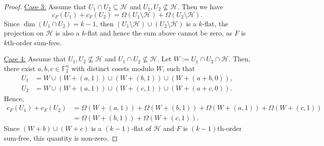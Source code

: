 \documentclass[10pt,a4paper]{amsart}
\newcommand{\F}{\mathbb F}
\newcommand{\HH}{\mathcal{H}}
\begin{document}
\begin{proof}
     \noindent \underline{Case 3:} Assume that $U_1\cap U_2\subseteq \HH$ and $U_1,U_2\not\subseteq \HH$. Then we have
     $$
     c_F(U_1) +c_F(U_2) = \Omega(U_1\setminus \HH) + \Omega(U_2 \setminus \HH).
     $$
     Since $\dim(U_1 \cap U_2) = k-1$, then $(U_1 \setminus \HH) \cup (U_2\setminus \HH)$ is a $k$-flat, the projection on $\HH$ is also a $k$-flat and hence the sum above cannot be zero, as $F$ is $k$th-order sum-free. 

     \noindent \underline{Case 4:} Assume that $U_1,U_2\not\subseteq \HH$ and $U_1\cap U_2\not\subseteq \HH$. Let $W:= U_1 \cap U_2 \cap \HH$. Then, there exist  $a, b, c \in \F_2^n$ with distinct cosets modulo $W$, such that
     \begin{align*}
         U_1 &= W \cup (W + (a, 1)) \cup (W+ (b, 1)) \cup (W + (a+b, 0)), \\
         U_2 &= W \cup (W+(a, 1)) \cup (W + (c, 1)) \cup (W+ (a+c, 0)).
     \end{align*}
     Hence, 
     \begin{align*}
     c_F(U_1) + c_F(U_2)& = \Omega(W + (a, 1)) + \Omega(W + (b, 1)) + \Omega(W + (a, 1)) + \Omega(W + (c, 1)) \\
     &= \Omega(W + (b, 1)) + \Omega(W + (c, 1)).
     \end{align*}
     Since $(W + b)\cup (W + c)$ is a $(k-1)$-flat of $\HH$ and $F$ is $(k-1)$th-order sum-free, this quantity is non-zero.
 \end{proof}
\end{document}
